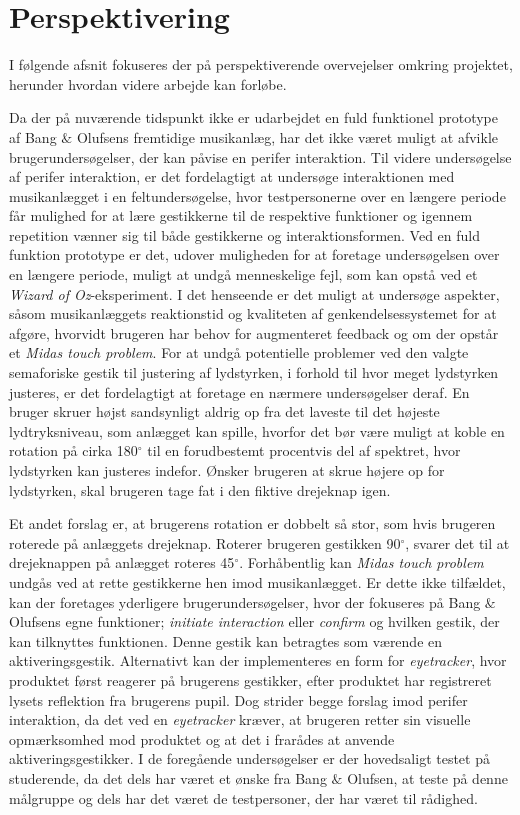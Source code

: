 \chapter{Perspektivering}
\label{Perspektivering}
%
I følgende afsnit fokuseres der på perspektiverende overvejelser omkring projektet, herunder hvordan videre arbejde kan forløbe.

Da der på nuværende tidspunkt ikke er udarbejdet en fuld funktionel prototype af Bang $\&$ Olufsens fremtidige musikanlæg, har det ikke været muligt at afvikle brugerundersøgelser, der kan påvise en perifer interaktion. Til videre undersøgelse af perifer interaktion, er det fordelagtigt at undersøge interaktionen med musikanlægget i en feltundersøgelse, hvor testpersonerne over en længere periode får mulighed for at lære gestikkerne til de respektive funktioner og igennem repetition vænner sig til både gestikkerne og interaktionsformen. Ved en fuld funktion prototype er det, udover muligheden for at foretage undersøgelsen over en længere periode, muligt at undgå menneskelige fejl, som kan opstå ved et \textit{Wizard of Oz}-eksperiment. I det henseende er det muligt at undersøge aspekter, såsom musikanlæggets reaktionstid og kvaliteten af genkendelsessystemet for at afgøre, hvorvidt brugeren har behov for augmenteret feedback og om der opstår et \textit{Midas touch problem}.\blankline
%
For at undgå potentielle problemer ved den valgte semaforiske gestik til justering af lydstyrken, i forhold til hvor meget lydstyrken justeres, er det fordelagtigt at foretage en nærmere undersøgelser deraf. En bruger skruer højst sandsynligt aldrig op fra det laveste til det højeste lydtryksniveau, som anlægget kan spille, hvorfor det bør være muligt at koble en rotation på cirka 180$^{\circ}$ til en forudbestemt procentvis del af spektret, hvor lydstyrken kan justeres indefor. Ønsker brugeren at skrue højere op for lydstyrken, skal brugeren tage fat i den fiktive drejeknap igen. 

Et andet forslag er, at brugerens rotation er dobbelt så stor, som hvis brugeren roterede på anlæggets drejeknap. Roterer brugeren gestikken 90$^{\circ}$, svarer det til at drejeknappen på anlægget roteres 45$^{\circ}$.\blankline 
%
Forhåbentlig kan \textit{Midas touch problem} undgås ved at rette gestikkerne hen imod musikanlægget. Er dette ikke tilfældet, kan der foretages yderligere brugerundersøgelser, hvor der fokuseres på Bang $\&$ Olufsens egne funktioner; \textit{initiate interaction} eller \textit{confirm} og hvilken gestik, der kan tilknyttes funktionen. Denne gestik kan betragtes som værende en aktiveringsgestik. Alternativt kan der implementeres en form for \textit{eyetracker}, hvor produktet først reagerer på brugerens gestikker, efter produktet har registreret lysets reflektion fra brugerens pupil. Dog strider begge forslag imod perifer interaktion, da det ved en \textit{eyetracker} kræver, at brugeren retter sin visuelle opmærksomhed mod produktet og at det i  frarådes at anvende aktiveringsgestikker.\blankline   
%
I de foregående undersøgelser er der hovedsaligt testet på studerende, da det dels har været et ønske fra Bang $\&$ Olufsen, at teste på denne målgruppe og dels har det været de testpersoner, der har været til rådighed. 

